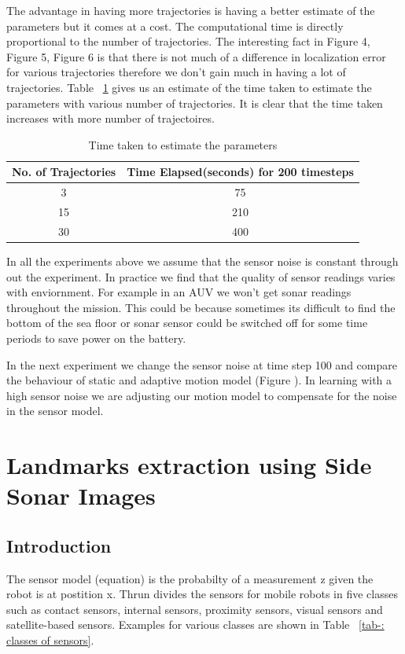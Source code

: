 \documentclass[12pt,draft]{dalcsthesis}
\begin{document}
The advantage in having more trajectories is having a better estimate of the parameters but it comes at a cost. The computational time is directly proportional to the number of trajectories. The interesting fact in Figure 4, Figure 5, Figure 6 is that there is not much of a difference in localization error for various trajectories therefore we don't gain much in having a lot of trajectories. Table ~\ref{tab-:timevstrajectory} gives us an estimate of the time taken to estimate the parameters with various number of trajectories. It is clear that the time taken increases with more number of trajectoires. 


\begin{table}[tbh]



\begin{tabular}{|c|c|}
\hline 
No. of Trajectories & Time Elapsed(seconds) for 200 timesteps\tabularnewline
\hline 
\hline 
3 & 75\tabularnewline
\hline 
15 & 210\tabularnewline
\hline 
30 & 400\tabularnewline
\hline 
\end{tabular}

\caption{\label{tab-:timevstrajectory}Time taken to estimate the parameters}

\end{table}

In all the experiments above we assume that the sensor noise is constant through out the experiment. In practice we find that the quality of sensor readings varies with enviornment. For example in an AUV we won't get sonar readings throughout the mission. This could be because sometimes its difficult to find the bottom of the sea floor or sonar sensor could be switched off for some time periods to save power on the battery.

In the next experiment we change the sensor noise  at time step 100 and compare the behaviour of static and adaptive motion model (Figure ). In learning with a high sensor noise we are adjusting our motion model to compensate for the noise in the sensor model.



\chapter{Landmarks extraction using Side Sonar Images}
\section{Introduction}
The sensor model (equation) is the probabilty of a measurement z given the robot is at postition x. Thrun \cite{thrun2005probabilistic} divides the sensors for mobile robots in five classes such as contact sensors, internal sensors, proximity sensors, visual sensors and satellite-based sensors. Examples for various classes are shown in Table ~\ref{tab-: classes of sensors}.
\end{document}
